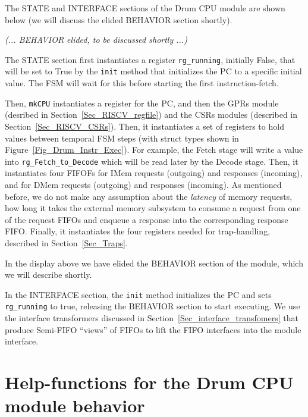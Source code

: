 \label{Sec_Drum_CPU_module}


The STATE and INTERFACE sections of the Drum CPU module are shown
below (we will discuss the elided BEHAVIOR section shortly).


\hm \emph{(... BEHAVIOR elided, to be discussed shortly ...)}


The STATE section first instantiates a register \verb|rg_running|,
initially False, that will be set to True by the \verb|init| method
that initializes the PC to a specific initial value.  The FSM will
wait for this before starting the first instruction-fetch.

Then, \verb|mkCPU| instantiates a register for the PC, and then the
GPRs module (desribed in Section~\ref{Sec_RISCV_regfile}) and the CSRs
modules (described in Section~\ref{Sec_RISCV_CSRs}).  Then, it
instantiates a set of registers to hold values between temporal FSM
steps (with struct types shown in Figure~\ref{Fig_Drum_Instr_Exec}).
For example, the Fetch stage will write a value into
\verb|rg_Fetch_to_Decode| which will be read later by the Decode
stage.  Then, it instantiates four FIFOFs for IMem requests (outgoing)
and responses (incoming), and for DMem requests (outgoing) and
responses (incoming). As mentioned before, we do not make any
assumption about the \emph{latency} of memory requests, {\ie} how long
it takes the external memory subsystem to consume a request from one
of the request FIFOs and enqueue a response into the corresponding
response FIFO.  Finally, it instantiates the four registers needed for
trap-handling, described in Section~\ref{Sec_Traps}.

In the display above we have elided the BEHAVIOR section of the
module, which we will describe shortly.

In the INTERFACE section, the \verb|init| method initializes the PC
and sets \verb|rg_running| to true, releasing the BEHAVIOR section to
start executing.  We use the interface transformers discussed in
Section~\ref{Sec_interface_transfomers} that produce Semi-FIFO
``views'' of FIFOs to lift the FIFO interfaces into the module
interface.


\section{Help-functions for the Drum CPU module behavior}

